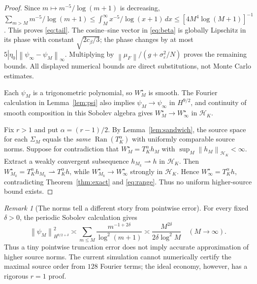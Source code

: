 \documentclass[11pt,a4paper]{article}
\theoremstyle{remark}
\newtheorem{remark}[theorem]{Remark}
\newcommand{\Hh}{\mathcal H_K}
\newcommand{\Ran}{\operatorname{Ran}}
\newcommand{\norm}[1]{\left\lVert#1\right\rVert}
\begin{document}
\begin{proof}
Since $m\mapsto m^{-5}/\log(m+1)$ is decreasing,
$\sum_{m>M}m^{-5}/\log(m+1)\le\int_M^\infty x^{-5}/\log(x+1)\,dx\le[4M^4\log(M+1)]^{-1}$. This proves \eqref{eq:tail}. The cosine--sine vector in \eqref{eq:beta} is globally Lipschitz in its phase with constant $\sqrt{2c_\beta/3}$; the phase changes by at most $5|\eta_0|\norm{\psi_\infty-\psi_M}_\infty$. Multiplying by $\norm{\mu_F}/(g+\sigma_\varepsilon^2/N)$ proves the remaining bounds. All displayed numerical bounds are direct substitutions, not Monte Carlo estimates.

Each $\psi_M$ is a trigonometric polynomial, so $W_M^\star$ is smooth. The Fourier calculation in Lemma~\ref{lem:psi} also implies $\psi_M\to\psi_\infty$ in $H^{9/2}$, and continuity of smooth composition in this Sobolev algebra gives $W_M^\star\to W_\infty^\star$ in $\Hh$.

Fix $r>1$ and put $\alpha=(r-1)/2$. By Lemma~\ref{lem:sandwich}, the source space for each $\Sigma_M$ equals the \emph{same} $\Ran(T_K^\alpha)$ with uniformly comparable source norms. Suppose for contradiction that $W_M^\star=T_K^\alpha h_M$ with $\sup_M\norm{h_M}_{\Hh}<\infty$. Extract a weakly convergent subsequence $h_{M_k}\rightharpoonup h$ in $\Hh$. Then $W_{M_k}^\star=T_K^\alpha h_{M_k}\rightharpoonup T_K^\alpha h$, while $W_{M_k}^\star\to W_\infty^\star$ strongly in $\Hh$. Hence $W_\infty^\star=T_K^\alpha h$, contradicting Theorem~\ref{thm:exact} and \eqref{eq:range}. Thus no uniform higher-source bound exists.
\end{proof}

\begin{remark}[The norms tell a different story from pointwise error]
For every fixed $\delta>0$, the periodic Sobolev calculation gives
\[
\norm{\psi_M}_{H^{9/2+\delta}}^2
 \asymp\sum_{m\le M}\frac{m^{-1+2\delta}}{\log^2(m+1)}
 \asymp\frac{M^{2\delta}}{2\delta\log^2 M}\quad(M\to\infty).
\]
Thus a tiny pointwise truncation error does not imply accurate approximation of higher source norms. The current simulation cannot numerically certify the maximal source order from $128$ Fourier terms; the ideal economy, however, has a rigorous $r=1$ proof.
\end{remark}
\end{document}
